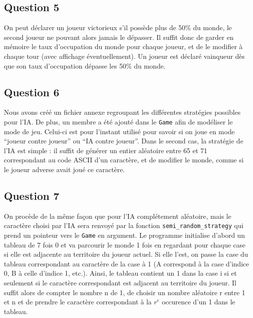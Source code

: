 \documentclass{article}
\begin{document}
\subsection{Question 5}
    On peut déclarer un joueur victorieux s'il possède plus de 50\% du monde, le second joueur ne pouvant alors jamais le dépasser. Il suffit donc de garder en mémoire le taux d'occupation du monde pour chaque joueur, et de le modifier à chaque tour (avec affichage éventuellement). Un joueur est déclaré vainqueur dès que son taux d'occupation dépasse les 50\% du monde.
\subsection{Question 6}
    Nous avons créé un fichier annexe regroupant les différentes stratégies possibles pour l'IA. De plus, un membre a été ajouté dans le \texttt{Game} afin de modéliser le mode de jeu. Celui-ci est pour l'instant utilisé pour savoir si on joue en mode \enquote{joueur contre joueur} ou \enquote{IA contre joueur}. Dans le second cas, la stratégie de l'IA est simple : il suffit de générer un entier aléatoire entre 65 et 71 correspondant au code ASCII d'un caractère, et de modifier le monde, comme si le joueur adverse avait joué ce caractère.
\subsection{Question 7}
    On procède de la même façon que pour l'IA complétement aléatoire, mais le caractère choisi par l'IA sera renvoyé par la fonction \texttt{semi\_random\_strategy} qui prend un pointeur vers le \texttt{Game} en argument. Le programme initialise d'abord un tableau de 7 fois 0 et va parcourir le monde 1 fois en regardant pour chaque case si elle est adjacente au territoire du joueur actuel. Si elle l'est, on passe la case du tableau correspondant au caractère de la case à 1 (A correspond à la case d'indice 0, B à celle d'indice 1, etc.). Ainsi, le tableau contient un 1 dans la case i si et seulement si le caractère correspondant est adjacent au territoire du joueur. Il suffit alors de compter le nombre n de 1, de choisir un nombre aléatoire r entre 1 et n et de prendre le caractère correspondant à la $r^e$ occurence d'un 1 dans le tableau.
\end{document}
